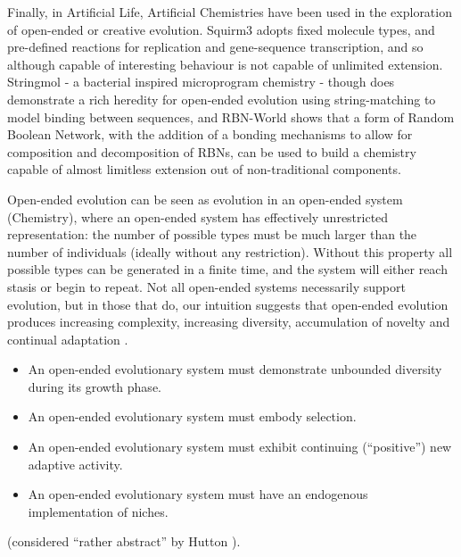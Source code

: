 Finally, in Artificial Life, Artificial Chemistries have been used in the exploration of open-ended or creative evolution. Squirm3 \parencite{Hutton2002,Hutton2009,Lucht2012} adopts fixed molecule types, and pre-defined reactions for replication and gene-sequence transcription, and so although capable of interesting behaviour is not capable of unlimited extension. Stringmol \parencite{Hickinbotham2011} - a bacterial inspired microprogram chemistry - though does demonstrate a rich heredity for open-ended evolution using string-matching to model binding between sequences, and RBN-World \parencite{Faulconbridge2011} shows that a form of Random Boolean Network, with the addition of a bonding mechanisms to allow for composition and decomposition of RBNs, can be used to build a chemistry capable of almost limitless extension out of non-traditional components.

Open-ended evolution can be seen as evolution in an open-ended system (\eg Chemistry), where an open-ended system has effectively unrestricted representation: the number of possible types must be much larger than the number of individuals (ideally without any restriction). Without this property all possible types can be generated in a finite time, and the system will either reach stasis or begin to repeat. Not all open-ended systems necessarily support evolution, but in those that do, our intuition suggests that open-ended evolution produces increasing complexity, increasing diversity, accumulation of novelty and continual adaptation \cite{Lehman2012}.


\begin{itemize}
	\item An open-ended evolutionary system must demonstrate unbounded diversity during its growth phase.
	\item An open-ended evolutionary system must embody selection.
	\item An open-ended evolutionary system must exhibit continuing (``positive'') new adaptive activity.
	\item An open-ended evolutionary system must have an endogenous implementation of niches.
\end{itemize} \cite{Maley:1999bs} (considered ``rather abstract'' by Hutton \parencite[p.341]{Hutton2002}).


